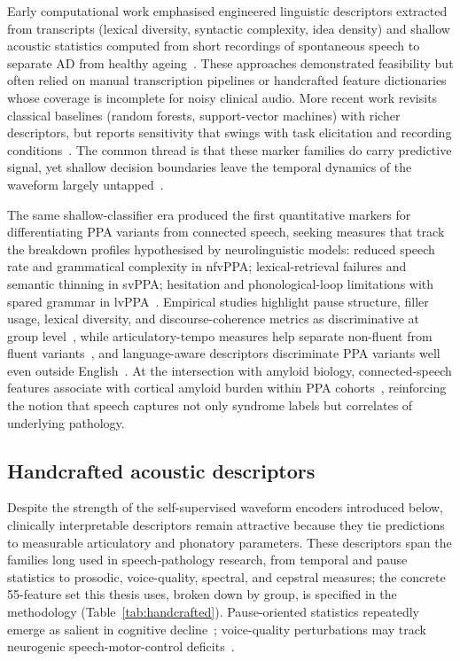 Early computational work emphasised engineered linguistic descriptors extracted from transcripts (lexical diversity, syntactic complexity, idea density) and shallow acoustic statistics computed from short recordings of spontaneous speech to separate AD from healthy ageing~\cite{fraser2016linguistic}.
These approaches demonstrated feasibility but often relied on manual transcription pipelines or handcrafted feature dictionaries whose coverage is incomplete for noisy clinical audio.
More recent work revisits classical baselines (random forests, support-vector machines) with richer descriptors, but reports sensitivity that swings with task elicitation and recording conditions~\cite{lima2025communicationsmedicine}. The common thread is that these marker families do carry predictive signal, yet shallow decision boundaries leave the temporal dynamics of the waveform largely untapped~\cite{fristed2022leveraging,gabirondo2025speechbiomarkers,slegers2021connectedppa}.

The same shallow-classifier era produced the first quantitative markers for differentiating PPA variants from connected speech, seeking measures that track the breakdown profiles hypothesised by neurolinguistic models: reduced speech rate and grammatical complexity in nfvPPA; lexical-retrieval failures and semantic thinning in svPPA; hesitation and phonological-loop limitations with spared grammar in lvPPA~\cite{gorno2011ppa}.
Empirical studies highlight pause structure, filler usage, lexical diversity, and discourse-coherence metrics as discriminative at group level~\cite{cho2022lexical}, while articulatory-tempo measures help separate non-fluent from fluent variants~\cite{cordella2017articulation,haley2021speechmetrics}, and language-aware descriptors discriminate PPA variants well even outside English~\cite{matias2019machineppa}.
At the intersection with amyloid biology, connected-speech features associate with cortical amyloid burden within PPA cohorts~\cite{slegers2021connectedppa}, reinforcing the notion that speech captures not only syndrome labels but correlates of underlying pathology.

\subsection{Handcrafted acoustic descriptors}

Despite the strength of the self-supervised waveform encoders introduced below, clinically interpretable descriptors remain attractive because they tie predictions to measurable articulatory and phonatory parameters.
These descriptors span the families long used in speech-pathology research, from temporal and pause statistics to prosodic, voice-quality, spectral, and cepstral measures; the concrete 55-feature set this thesis uses, broken down by group, is specified in the methodology (Table~\ref{tab:handcrafted}).
Pause-oriented statistics repeatedly emerge as salient in cognitive decline~\cite{imre2022temporal,zheng2024survey}; voice-quality perturbations may track neurogenic speech-motor-control deficits~\cite{rezaii2025voiceprints}.


